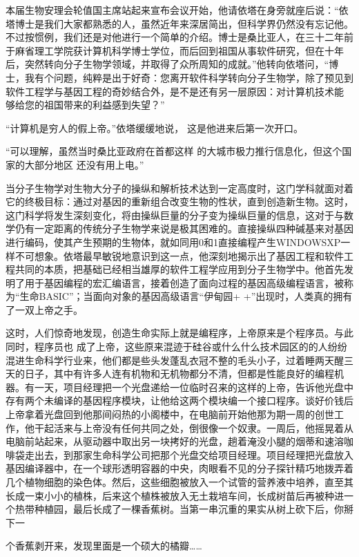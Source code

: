 \documentclass{article}
\begin{document}
本届生物安理会轮值国主席站起来宣布会议开始，他请依塔在身旁就座后说：“依塔博士是我们大家都熟悉的人，虽然近年来深居简出，但科学界仍然没有忘记他。不过按惯例，我们还是对他进行一个简单的介绍。博士是桑比亚人，在三十二年前于麻省理工学院获计算机科学博士学位，而后回到祖国从事软件研究，但在十年后，突然转向分子生物学领域，并取得了众所周知的成就。”他转向依塔问，“博士，我有个问题，纯粹是出于好奇：您离开软件科学转向分子生物学，除了预见到软件工程学与基因工程的奇妙结合外，是不是还有另一层原因：对计算机技术能
够给您的祖国带来的利益感到失望？” 

“计算机是穷人的假上帝。”依塔缓缓地说，
这是他进来后第一次开口。 

“可以理解，虽然当时桑比亚政府在首都这样
\newpage
的大城市极力推行信息化，但这个国家的大部分地区
还没有用上电。” 

当分子生物学对生物大分子的操纵和解析技术达到一定高度时，这门学科就面对着它的终极目标：通过对基因的重新组合改变生物的性状，直到创造新生物。这时，这门科学将发生深刻变化，将由操纵巨量的分子变为操纵巨量的信息，这对于与数学仍有一定距离的传统分子生物学来说是极其困难的。直接操纵四种碱基来对基因进行编码，使其产生预期的生物体，就如同用0和1直接编程产生WINDOWSXP一样不可想象。依塔最早敏锐地意识到这一点，他深刻地揭示出了基因工程和软件工程共同的本质，把基础已经相当雄厚的软件工程学应用到分子生物学中。他首先发明了用于基因编程的宏汇编语言，接着创造了面向过程的基因高级编程语言，被称为“生命BASIC”；当面向对象的基因高级语言“伊甸园+
+”出现时，人类真的拥有了一双上帝之手。 

这时，人们惊奇地发现，创造生命实际上就是编程序，上帝原来是个程序员。与此同时，程序员也
\newpage
成了上帝，这些原来混迹于硅谷或什么什么技术园区的的人纷纷混进生命科学行业来，他们都是些头发蓬乱衣冠不整的毛头小子，过着睡两天醒三天的日子，其中有许多人连有机物和无机物都分不清，但都是性能良好的编程机器。有一天，项目经理把一个光盘递给一位临时召来的这样的上帝，告诉他光盘中存有两个未编译的基因程序模块，让他给这两个模块编一个接口程序。谈好价钱后上帝拿着光盘回到他那间闷热的小阁楼中，在电脑前开始他那为期一周的创世工作，他干起活来与上帝没有任何共同之处，倒很像一个奴隶。一周后，他摇晃着从电脑前站起来，从驱动器中取出另一块拷好的光盘，趟着淹没小腿的烟蒂和速溶咖啡袋走出去，到那家生命科学公司把那个光盘交给项目经理。项目经理把光盘放入基因编译器中，在一个球形透明容器的中央，肉眼看不见的分子探针精巧地拨弄着几个植物细胞的染色体。然后，这些细胞被放入一个试管的营养液中培养，直至其长成一束小小的植株，后来这个植株被放入无土栽培车间，长成树苗后再被种进一个热带种植园，最后长成了一棵香蕉树。当第一串沉重的果实从树上砍下后，你掰下一

\newpage
个香蕉剥开来，发现里面是一个硕大的橘瓣…… 
\end{document}
